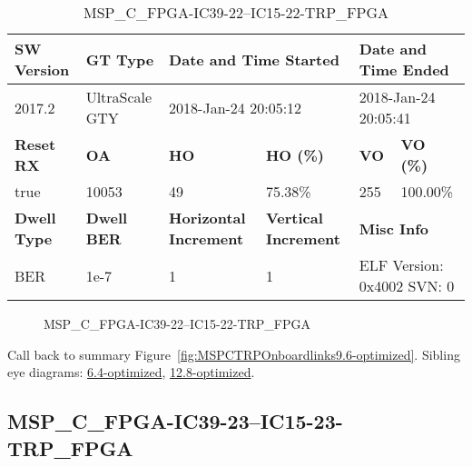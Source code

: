 \begin{table}[h]
\centering
\caption{MSP\_C\_FPGA-IC39-22--IC15-22-TRP\_FPGA}
\label{tab:MSPCFPGAIC3922IC1522TRPFPGA9.6-optimized}
\begin{tabular}{@{}|l|l|l|l|l|l|@{}}
\toprule
\textbf{SW Version}                & \textbf{GT Type}   & \multicolumn{2}{l|}{\textbf{Date and Time Started}}            & \multicolumn{2}{l|}{\textbf{Date and Time Ended}}        \\ \midrule
2017.2                       & UltraScale GTY          & \multicolumn{2}{l|}{2018-Jan-24 20:05:12}                   & \multicolumn{2}{l|}{2018-Jan-24 20:05:41}               \\ \midrule
\textbf{Reset RX}                  & \textbf{OA} & \textbf{HO}   & \textbf{HO (\%)} & \textbf{VO} & \textbf{VO (\%)} \\ \midrule
true & 10053        & 49          & 75.38\%        & 255        & 100.00\%       \\ \midrule
\textbf{Dwell Type}                & \textbf{Dwell BER} & \textbf{Horizontal Increment} & \textbf{Vertical Increment}    & \multicolumn{2}{l|}{\textbf{Misc Info}}                  \\ \midrule
BER                            & 1e-7        & 1        & 1           & \multicolumn{2}{l|}{ELF Version: 0x4002 SVN: 0}                         \\ \bottomrule
\end{tabular}
\end{table}

\begin{figure}[h]
\caption{MSP\_C\_FPGA-IC39-22--IC15-22-TRP\_FPGA} \label{fig:MSPCFPGAIC3922IC1522TRPFPGA9.6-optimized}
\end{figure}

Call back to summary Figure~\ref{fig:MSPCTRPOnboardlinks9.6-optimized}.
Sibling eye diagrams: \hyperref[sec:MSPCFPGAIC3922IC1522TRPFPGA6.4-optimized]{6.4-optimized}, \hyperref[sec:MSPCFPGAIC3922IC1522TRPFPGA12.8-optimized]{12.8-optimized}.

\clearpage
\newpage


\subsection{MSP\_C\_FPGA-IC39-23--IC15-23-TRP\_FPGA}\label{sec:MSPCFPGAIC3923IC1523TRPFPGA9.6-optimized}

